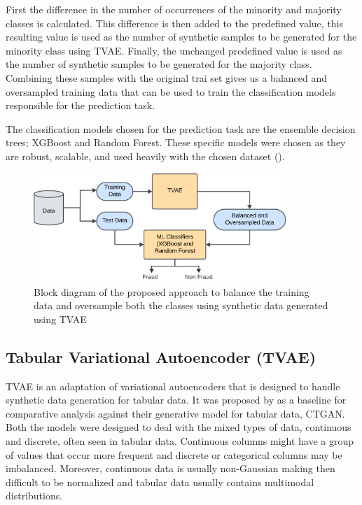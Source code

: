 \documentclass[twoside,11pt]{article}
\begin{document}
First the difference in the number of occurrences of the minority and majority classes is calculated. This difference is then added to the predefined value, this resulting value is used as the number of synthetic samples to be generated for the minority class using TVAE. Finally, the unchanged predefined value is used as the number of synthetic samples to be generated for the majority class. Combining these samples with the original trai set gives us a balanced and oversampled training data that can be used to train the classification models responsible for the prediction task. 

The classification models chosen for the prediction task are the ensemble decision trees; XGBoost and Random Forest. These specific models were chosen as they are robust, scalable, and used heavily with the chosen dataset (\cite{schrijverAutomobileInsuranceFraud2024, Salmi2022, aiemsuwanNovelHybridMethod2024, owolabiAutoInsuranceFraudDetection2024}). 

\begin{figure}
  \centering
  \includegraphics[width=0.85\textwidth]{images/model_tvae.png}
  \caption{Block diagram of the proposed approach to balance the training data and oversample both the classes using synthetic data generated using TVAE}
  \label{fig:model}
\end{figure}

\subsection{Tabular Variational Autoencoder (TVAE)}
TVAE is an adaptation of variational autoencoders that is designed to handle synthetic data generation for tabular data. It was proposed by \cite{XuRp} as a baseline for comparative analysis against their generative model for tabular data, CTGAN. Both the models were designed to deal with the mixed types of data, continuous and discrete, often seen in tabular data. Continuous columns might have a group of values that occur more frequent and discrete or categorical columns may be imbalanced. Moreover, continuous data is usually non-Gaussian making then difficult to be normalized and tabular data usually contains multimodal distributions. 
\end{document}

